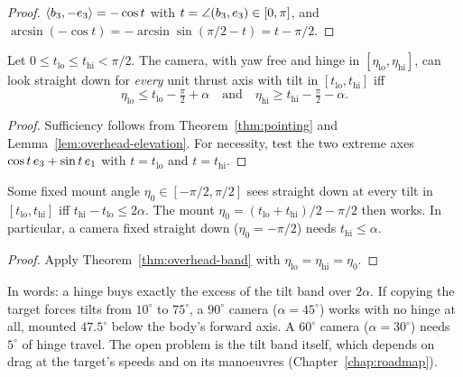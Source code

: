 \begin{proof}
\leanok
$\langle b_3, -e_3 \rangle=-\cos t$ with $t=\angle(b_3,e_3)\in[0,\pi]$, and
$\arcsin(-\cos t)=-\arcsin\sin(\pi/2-t)=t-\pi/2$.
\end{proof}

\begin{theorem}
\label{thm:overhead-band}
\leanok
{}
Let $0\le t_{\mathrm{lo}}\le t_{\mathrm{hi}}<\pi/2$. The camera, with yaw free and
hinge in $[\eta_{\mathrm{lo}},\eta_{\mathrm{hi}}]$, can look straight down for
\emph{every} unit thrust axis with tilt in $[t_{\mathrm{lo}},t_{\mathrm{hi}}]$ iff
\[
  \eta_{\mathrm{lo}}\le t_{\mathrm{lo}}-\tfrac{\pi}{2}+\alpha
  \quad\text{and}\quad
  \eta_{\mathrm{hi}}\ge t_{\mathrm{hi}}-\tfrac{\pi}{2}-\alpha .
\]
\end{theorem}

\begin{proof}
\leanok
Sufficiency follows from Theorem~\ref{thm:pointing} and
Lemma~\ref{lem:overhead-elevation}. For necessity, test the two extreme axes
$\cos t\,e_3+\sin t\,e_1$ with $t=t_{\mathrm{lo}}$ and $t=t_{\mathrm{hi}}$.
\end{proof}

\begin{theorem}
\label{thm:fixed-overhead}
\leanok
{}
Some fixed mount angle $\eta_0\in[-\pi/2,\pi/2]$ sees straight down at every tilt in
$[t_{\mathrm{lo}},t_{\mathrm{hi}}]$ iff $t_{\mathrm{hi}}-t_{\mathrm{lo}}\le2\alpha$.
The mount $\eta_0=(t_{\mathrm{lo}}+t_{\mathrm{hi}})/2-\pi/2$ then works. In
particular, a camera fixed straight down ($\eta_0=-\pi/2$) needs
$t_{\mathrm{hi}}\le\alpha$.
\end{theorem}

\begin{proof}
\leanok
Apply Theorem~\ref{thm:overhead-band} with
$\eta_{\mathrm{lo}}=\eta_{\mathrm{hi}}=\eta_0$.
\end{proof}

\begin{remark}
In words: a hinge buys exactly the excess of the tilt band over $2\alpha$. If
copying the target forces tilts from $10^\circ$ to $75^\circ$, a $90^\circ$
camera ($\alpha=45^\circ$) works with no hinge at all, mounted $47.5^\circ$ below
the body's forward axis. A $60^\circ$ camera ($\alpha=30^\circ$) needs $5^\circ$ of
hinge travel. The open problem is the tilt band itself, which depends on drag at
the target's speeds and on its manoeuvres (Chapter~\ref{chap:roadmap}).
\end{remark}
